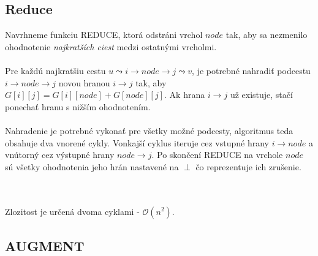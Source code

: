 \documentclass[paper=a4, fontsize=11pt]{scrartcl} %
\numberwithin{equation}{section} %
\numberwithin{figure}{section} %
\numberwithin{table}{section} %
\begin{document}
\subsection*{Reduce}

Navrhneme funkciu REDUCE, ktorá odstráni vrchol $node$ tak, aby sa nezmenilo ohodnotenie {\em najkratších ciest} medzi ostatnými vrcholmi.\\
\ \\
Pre každú najkratšiu cestu $u \leadsto i \to node \to j \leadsto v$, je potrebné nahradiť podcestu $i \to node \to j$ novou hranou $i \to j$ tak, aby $G[i][j] = G[i][node] + G[node][j]$. Ak hrana $i \to j$ už existuje, stačí ponechať hranu s nižším ohodnotením.\\
\ \\
Nahradenie je potrebné vykonať pre všetky možné podcesty, algoritmus teda obsahuje dva vnorené cykly. Vonkajší cyklus iteruje cez vstupné hrany $i \to node$ a vnútorný cez výstupné hrany $node \to j$. Po skončení REDUCE na vrchole $node$ sú všetky ohodnotenia jeho hrán nastavené na $\perp$ čo reprezentuje ich zrušenie.\\
\ \\
\begin{algorithmic}[1]
                       \EndIf
                   \EndIf
                \EndFor                
            \EndIf            
        \EndFor
       \EndFor
        \State {}
    \EndFunction
\end{algorithmic}
\ \\
Zlozitost je určená dvoma cyklami - $\mathcal{O}(n^2)$.

\subsection*{AUGMENT}
\end{document}
